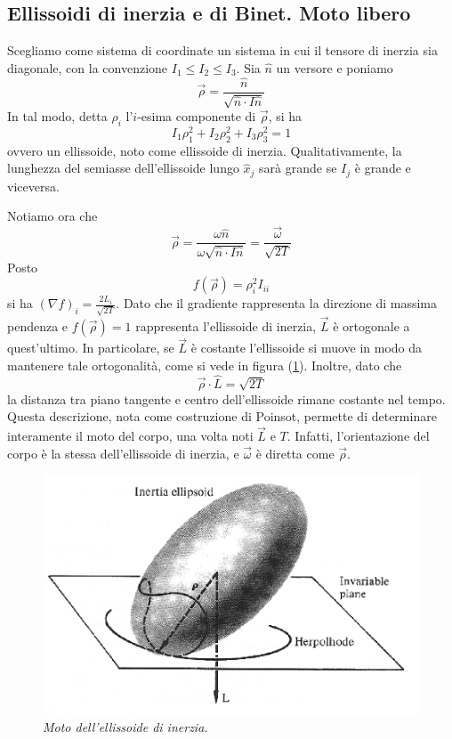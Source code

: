 \documentclass[a4paper,11pt]{article}
\begin{document}
\subsection{Ellissoidi di inerzia e di Binet. Moto libero}
Scegliamo come sistema di coordinate un sistema in cui il tensore di inerzia sia diagonale, con la convenzione $I_1\leq I_2\leq I_3$. Sia $\hat{n}$ un versore e poniamo
\[\vec{\rho}=\frac{\hat{n}}{\sqrt{\hat{n}\cdot I\hat{n}}}\]
In tal modo, detta $\rho_i$ l'$i$-esima componente di $\vec{\rho}$, si ha
\[I_1\rho_1^2+I_2\rho_2^2+I_3\rho_3^2=1\]
ovvero un ellissoide, noto come ellissoide di inerzia. Qualitativamente, la lunghezza del semiasse dell'ellissoide lungo $\hat{x}_j$ sarà grande se $I_j$ è grande e viceversa.

\noindent Notiamo ora che
\[\vec{\rho}=\frac{\omega\hat{n}}{\omega\sqrt{\hat{n}\cdot I\hat{n}}}=\frac{\vec{\omega}}{\sqrt{2T}}\]
Posto
\[f(\vec{\rho})=\rho_i^2 I_{ii}\]
si ha $\left(\nabla f\right)_i=\frac{2L_i}{\sqrt{2T}}$. Dato che il gradiente rappresenta la direzione di massima pendenza e $f(\vec\rho)=1$ rappresenta l'ellissoide di inerzia, $\vec L$ è ortogonale a quest'ultimo. In particolare, se $\vec{L}$ è costante l'ellissoide si muove in modo da mantenere tale ortogonalità, come si vede in figura (\ref{ellissoideinerzia}). Inoltre, dato che
\[\vec{\rho}\cdot\hat{L}=\sqrt{2T}\]
la distanza tra piano tangente e centro dell'ellissoide rimane costante nel tempo. Questa descrizione, nota come costruzione di Poinsot, permette di determinare interamente il moto del corpo, una volta noti $\vec{L}$ e $T$. Infatti, l'orientazione del corpo è la stessa dell'ellissoide di inerzia, e $\vec{\omega}$ è diretta come $\vec{\rho}$.
\begin{figure}
	\centering
	\includegraphics[scale=0.6]{ellissoide_inerzia.png}
	\caption{\textit{Moto dell'ellissoide di inerzia.}}
	\label{ellissoideinerzia}
\end{figure}
\vspace{5mm}
\end{document}
